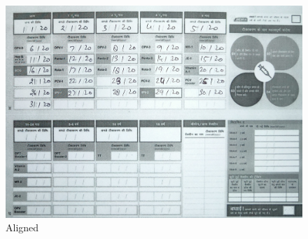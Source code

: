 \documentclass{article}
\begin{document}
    \begin{figure}[!htb]
    \minipage{\textwidth}
    \begin{center}
      \includegraphics[scale=.2]{4/.report/_aligned/p1.jpg}
      \caption{Aligned}
    \end{center}
    \endminipage
    \end{figure}
\end{document}

